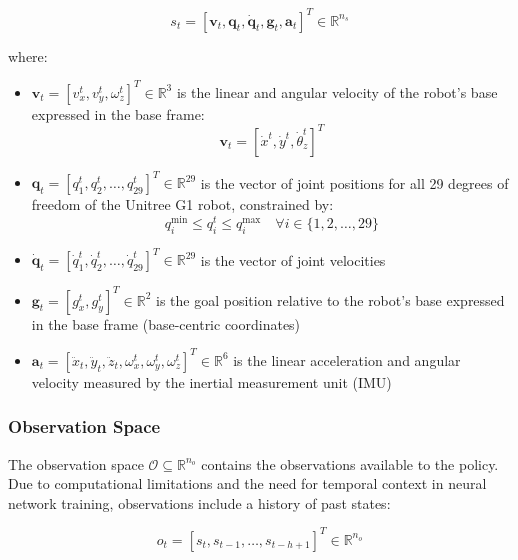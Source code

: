 \documentclass[12pt,a4paper]{article}
\begin{document}
\begin{equation}
s_t = \left[ \mathbf{v}_t, \mathbf{q}_t, \dot{\mathbf{q}}_t, \mathbf{g}_t, \mathbf{a}_t \right]^T \in \mathbb{R}^{n_s}
\end{equation}

where:

\begin{itemize}
\item $\mathbf{v}_t = [v_x^t, v_y^t, \omega_z^t]^T \in \mathbb{R}^3$ is the linear and angular velocity of the robot's base expressed in the base frame:
\begin{equation}
\mathbf{v}_t = \left[ \dot{x}^t, \dot{y}^t, \dot{\theta}_z^t \right]^T
\end{equation}

\item $\mathbf{q}_t = [q_1^t, q_2^t, \ldots, q_{29}^t]^T \in \mathbb{R}^{29}$ is the vector of joint positions for all 29 degrees of freedom of the Unitree G1 robot, constrained by:
\begin{equation}
q_i^{\min} \leq q_i^t \leq q_i^{\max} \quad \forall i \in \{1, 2, \ldots, 29\}
\end{equation}

\item $\dot{\mathbf{q}}_t = [\dot{q}_1^t, \dot{q}_2^t, \ldots, \dot{q}_{29}^t]^T \in \mathbb{R}^{29}$ is the vector of joint velocities

\item $\mathbf{g}_t = [g_x^t, g_y^t]^T \in \mathbb{R}^2$ is the goal position relative to the robot's base expressed in the base frame (base-centric coordinates)

\item $\mathbf{a}_t = [\ddot{x}_t, \ddot{y}_t, \ddot{z}_t, \omega_x^t, \omega_y^t, \omega_z^t]^T \in \mathbb{R}^6$ is the linear acceleration and angular velocity measured by the inertial measurement unit (IMU)
\end{itemize}

\subsubsection{Observation Space}

The observation space $\mathcal{O} \subseteq \mathbb{R}^{n_o}$ contains the observations available to the policy. Due to computational limitations and the need for temporal context in neural network training, observations include a history of past states:

\begin{equation}
o_t = [s_t, s_{t-1}, \ldots, s_{t-h+1}]^T \in \mathbb{R}^{n_o}
\end{equation}
\end{document}
